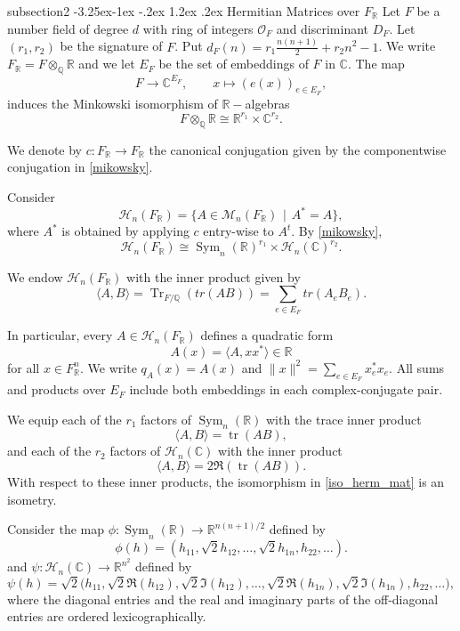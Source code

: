 \documentclass[11pt,a4paper,twoside]{amsart}
\makeatletter
\renewcommand{\subsection}{\@startsection
  {subsection}{2}{\z@}%
  {-3.25ex\@plus -1ex \@minus -.2ex}%
  {1.2ex \@plus .2ex}%
  {\normalfont\bfseries}}
\theoremstyle{plain}
\theoremstyle{definition}
\newcommand{\rint}[0]{\mathcal{O}_F}
\newcommand{\disc}[0]{D_F}
\newcommand{\sym}[0]{\operatorname{Sym}_n(\mathbb{R})}
\newcommand{\Her}[0]{\mathcal{H}_n(\fr)}
\newcommand{\fr}[0]{F_\mathbb{R}}
\newcommand{\tr}{\operatorname{Tr}}
\makeatother
\begin{document}
\subsection{Hermitian Matrices over $F_\mathbb{R}$}
Let $F$ be a number field of degree $d$ with ring of integers $\rint$ and discriminant $\disc$. Let $(r_1,r_2)$ be the signature of $F$. Put $d_F(n)=r_1\frac{n(n+1)}{2}+r_2n^2-1$. We write $\fr = F\otimes_\mathbb{Q} \mathbb{R}$ and we let $E_F$ be the set of embeddings of $F$ in $\mathbb{C}.$
The map
$$
F \longrightarrow \mathbb C^{E_F},
\qquad
x\longmapsto (e(x))_{e\in E_F},
$$
induces the Minkowski isomorphism of $\mathbb{R}-$algebras
\begin{equation}
\label{mikowsky}
    F\otimes_{\mathbb Q}\mathbb R
\cong
\mathbb R^{r_1}\times\mathbb C^{r_2}.
\end{equation}

We denote by $c :\fr \to \fr$ the canonical conjugation given by the componentwise conjugation in \eqref{mikowsky}.

Consider 
$$\Her = \{ A\in\mathcal{M}_{n}(\fr) \hspace{5pt} | \hspace{5pt} A^* = A\},$$
where $A^*$ is obtained by applying $c$ entry-wise to $A^t$.
By \eqref{mikowsky},
\begin{equation}
\label{iso_herm_mat}
    \Her \cong \sym^{r_1}\times \mathcal{H}_n(\mathbb{C})^{r_2}.
\end{equation}

We endow $\Her$ with the inner product given by 
$$\langle A,B\rangle = \tr_{F/\mathbb{Q}}(tr(AB)) = \sum_{e\in E_F}tr(A_{e}B_{e}).$$
 
In particular, every $A\in\Her$ defines a quadratic form
$$A(x) = \langle A, xx^*\rangle \in\mathbb{R}$$
for all $x\in \fr^n$. We write $q_A(x)=A(x)$ and $\|x\|^2=\sum_{e\in E_F}x_e^*x_e$. All sums and products over $E_F$ include both embeddings in each complex-conjugate pair.

We equip each of the $r_1$ factors of $\sym$ with the trace inner product
$$
\langle A,B\rangle=\operatorname{tr}(AB),
$$
and each of the $r_2$ factors of $\mathcal H_n(\mathbb C)$ with the inner product
$$
\langle A,B\rangle=2\mathfrak{R}(\operatorname{tr}(AB)).
$$
With respect to these inner products, the isomorphism in \eqref{iso_herm_mat} is an isometry.

Consider the map
$
\phi:\sym
\longrightarrow
\mathbb{R}^{n(n+1)/2}
$
defined by
\begin{equation}
\label{isometry_real}
\phi(h)
=
(h_{11},\sqrt{2}h_{12},\ldots,\sqrt{2}h_{1n},h_{22},\dots).
\end{equation}
and
$
\psi:\mathcal{H}_n(\mathbb{C})
\longrightarrow
\mathbb{R}^{n^2}
$
defined by
\begin{equation}
\label{isometry_complex}
\psi(h)
=
\sqrt{2}\bigl(
h_{11},
\sqrt{2}\mathfrak{R}(h_{12}),
\sqrt{2}\mathfrak{I}(h_{12}),
\ldots,
\sqrt{2}\mathfrak{R}(h_{1n}),
\sqrt{2}\mathfrak{I}(h_{1n}),
h_{22},
\ldots
\bigr),
\end{equation}
where the diagonal entries and the real and imaginary parts of the off-diagonal entries are ordered lexicographically.
\end{document}
